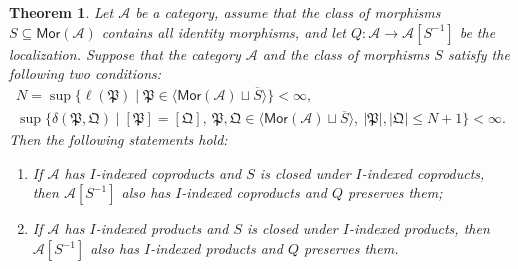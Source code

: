 \documentclass[10pt,a4paper]{amsart}
\theoremstyle{plain}
\newtheorem{theorem}{Theorem}[section]
\theoremstyle{definition}
\theoremstyle{remark}
\begin{document}
\begin{theorem}\label{cor:fraction-calculus-preservation}
  Let $\mathcal{A}$ be a category, assume that the class of morphisms $S \subseteq \mathsf{Mor}(\mathcal{A})$ contains all identity morphisms, and let $Q : \mathcal{A} \longrightarrow \mathcal{A}[S^{-1}]$ be the localization.
  Suppose that the category $\mathcal{A}$ and the class of morphisms $S$ satisfy the following two conditions:
  \begin{align*}
    N = \sup \big\{\ell(\mathfrak P) \mid \mathfrak P\in \langle\mathsf{Mor}(\mathcal A)\sqcup\overline{S}\rangle\big\} < \infty, \\
    \sup\big\{ \delta(\mathfrak P,\mathfrak Q) \mid [\mathfrak P]=[\mathfrak Q], \ \mathfrak P, \mathfrak Q\in \langle\mathsf{Mor}(\mathcal A)\sqcup\overline{S}\rangle, \ |\mathfrak P|, |\mathfrak Q| \leq N+1\big\} < \infty.
  \end{align*}
  Then the following statements hold:
  \begin{enumerate}[label=\textup{(\arabic*)}]
    \item If $\mathcal{A}$ has $I$-indexed coproducts and $S$ is closed under $I$-indexed coproducts, then $\mathcal{A}[S^{-1}]$ also has $I$-indexed coproducts and $Q$ preserves them;
    \item If $\mathcal{A}$ has $I$-indexed products and $S$ is closed under $I$-indexed products, then $\mathcal{A}[S^{-1}]$ also has $I$-indexed products and $Q$ preserves them.
  \end{enumerate}
\end{theorem}
\end{document}
